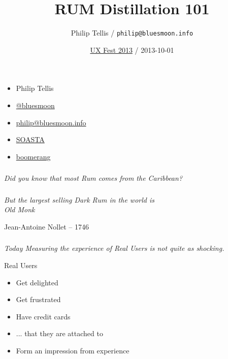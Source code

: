 \documentclass{beamer}
\author{Philip Tellis / \texttt{philip@bluesmoon.info}}
\title{RUM Distillation 101}
\date{\href{http://www.freshtilledsoil.com/uxfest/}{UX Fest 2013} / 2013-10-01}
\newcommand{\innersplash}[1]{
  \begin{center}
    \Large \textrm{\textit{ #1 } }
  \end{center}
}
\newcommand{\splashslide}[2][{}]{
  \begin{frame}
  \frametitle{#1}
  \innersplash{#2}
  \end{frame}
}
\begin{document}
\begin{frame}
  \begin{itemize}
  \item Philip Tellis
  \item \href{http://twitter.com/bluesmoon}{@bluesmoon}
  \item \href{http://bluesmoon.info/}{philip@bluesmoon.info}
  \item \href{http://www.soasta.com/}{SOASTA}
  \item \href{http://lognormal.github.com/boomerang/doc/}{boomerang}
  \end{itemize}
\end{frame}

\begin{frame}
  \titlepage
\end{frame}

\splashslide{Did you know that most Rum comes from the Caribbean?}

\splashslide{But the largest selling Dark Rum in the world is \\ Old Monk}

\begin{frame}{Jean-Antoine Nollet -- 1746}
\end{frame}

\splashslide{Today Measuring the experience of Real Users is not quite as shocking.}

\begin{frame}{Real Users}
   {
    \begin{block}{}
      \begin{itemize}
        \item Get delighted
        \item<3-> Get frustrated
        \item<4-> Have credit cards
        \item<5-> ... that they are attached to
        \item<6-> Form an impression from experience
      \end{itemize}
    \end{block}
  }
\end{frame}
\end{document}
